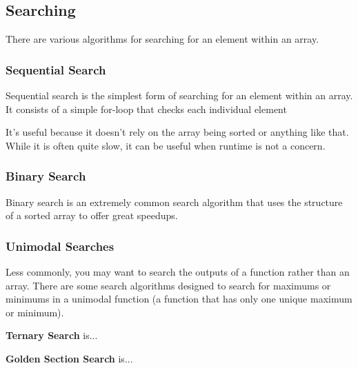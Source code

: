 \subsection{Searching}

There are various algorithms for searching for an element within an array.

\subsubsection{Sequential Search}

Sequential search is the simplest form of searching for an element within an array. It consists of a simple for-loop that checks each individual element 

It's useful because it doesn't rely on the array being sorted or anything like that. While it is often quite slow, it can be useful when runtime is not a concern.

\subsubsection{Binary Search}

Binary search is an extremely common search algorithm that uses the structure of a sorted array to offer great speedups.

\subsubsection{Unimodal Searches}

Less commonly, you may want to search the outputs of a function rather than an array. There are some search algorithms designed to search for maximums or minimums in a unimodal function (a function that has only one unique maximum or minimum).

\textbf{Ternary Search} is...

\textbf{Golden Section Search} is...